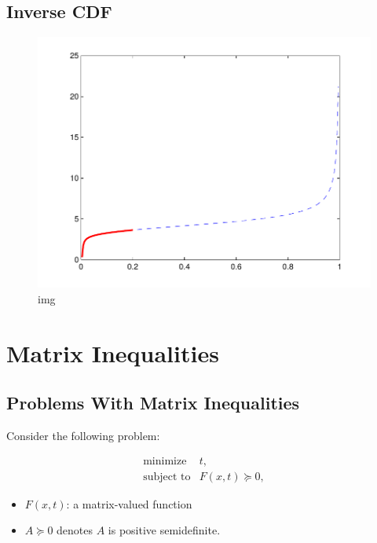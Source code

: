 \documentclass[]{article}
\providecommand{\tightlist}{%
  \setlength{\itemsep}{0pt}\setlength{\parskip}{0pt}}
\begin{document}
\hypertarget{inverse-cdf}{%
\subsection{Inverse CDF}\label{inverse-cdf}}

\begin{figure}
\centering
\includegraphics{ellipsoid.files/Fig2-b-invcdf.pdf}
\caption{img}
\end{figure}

\hypertarget{matrix-inequalities}{%
\section{Matrix Inequalities}\label{matrix-inequalities}}

\hypertarget{problems-with-matrix-inequalities}{%
\subsection{Problems With Matrix
Inequalities}\label{problems-with-matrix-inequalities}}

Consider the following problem:

\[\begin{array}{ll}
    \text{minimize}    & t, \\
    \text{subject to}  & F(x, t) \succeq 0,
\end{array}\]

\begin{itemize}
\tightlist
\item
  \(F(x, t)\): a matrix-valued function
\item
  \(A \succeq 0\) denotes \(A\) is positive semidefinite.
\end{itemize}
\end{document}
